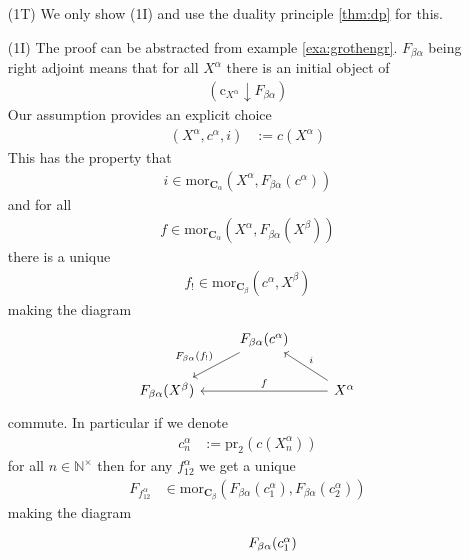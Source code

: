 \begin{prf}
\begin{enumerate}
\item[(1T)]
We only show (1I) and use the duality principle \ref{thm:dp} for this.
\item[(1I)]
The proof can be abstracted from example \ref{exa:grothengr}. $F_{\beta\alpha}$ being right adjoint means that for all $X^{\alpha}$ there is an initial object of
\begin{align*}
  \left(
    \mathrm{c}_{X^{\alpha}}
    \downarrow
    F_{\beta\alpha}
  \right)
\end{align*}
Our assumption provides an explicit choice
\begin{align*}
  (X^{\alpha},c^{\alpha},i)
  &:=
  c(X^{\alpha})
\end{align*}
This has the property that
\begin{align*}
  i
  \in
  \mathrm{mor}_{\mathbf{C}_{\alpha}}
  \left(
    X^{\alpha},
    F_{\beta\alpha}(c^{\alpha})
  \right)
\end{align*}
and for all
\begin{align*}
  f
  \in
  \mathrm{mor}_{\mathbf{C}_{\alpha}}
  \left(
    X^{\alpha},
    F_{\beta\alpha}(X^{\beta})
  \right)
\end{align*}
there is a unique
\begin{align*}
  f_{!}
  \in
  \mathrm{mor}_{\mathbf{C}_{\beta}}
  \left(
    c^{\alpha},
    X^{\beta}
  \right)
\end{align*}
making the diagram
\[
\begin{tikzcd}[sep=normal]
  &
  F_{\beta\alpha}(c^{\alpha})
  \arrow[swap]{dl}{F_{\beta\alpha}(f_{!})}
  &
  \\
  F_{\beta\alpha}(X^{\beta})
  &
  &
  X^{\alpha}
  \arrow[swap]{ll}{f}
  \arrow[swap]{ul}{i}
\end{tikzcd}
\]
commute. In particular if we denote
\begin{align*}
  c_{n}^{\alpha}
  &:=
  \mathrm{pr}_{2}
  \left(
    c(X_{n}^{\alpha})
  \right)
\end{align*}
for all $n \in \mathbb{N}^{\times}$ then for any $f_{12}^{\alpha}$ we get a unique
\begin{align*}
  F_{f_{12}^{\alpha}}
  &\in
  \mathrm{mor}_{\mathbf{C}_{\beta}}
  \left(
    F_{\beta\alpha}(c_{1}^{\alpha}),
    F_{\beta\alpha}(c_{2}^{\alpha})
  \right)
\end{align*}
making the diagram
\[
\begin{tikzcd}[sep=large]
  &
  F_{\beta\alpha}(c_{1}^{\alpha})

\end{tikzcd}\]
\end{enumerate}
\end{prf}
